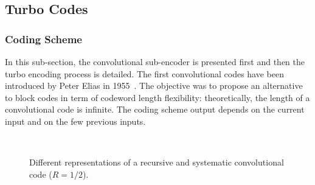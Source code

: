 

\subsection{Turbo Codes}
\label{sec:ctx_turbo}

\subsubsection{Coding Scheme}

In this sub-section, the convolutional sub-encoder is presented first and then
the turbo encoding process is detailed. The first convolutional codes have been
introduced by Peter Elias in 1955~\cite{Elias1955}. The objective was to propose
an alternative to block codes in term of codeword length flexibility:
theoretically, the length of a convolutional code is infinite. The coding scheme
output depends on the current input and on the few previous inputs.

\begin{figure}[htp]
  \centering
  \quad
  \\
  \caption{Different representations of a recursive and systematic convolutional
           code ($R = 1/2$).}
  \label{fig:ctx_turbo_sub_encoder}
\end{figure}

